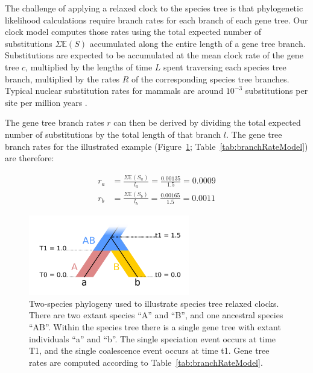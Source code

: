 \documentclass[nogrid]{MBE}%
\begin{document}
The challenge of applying a relaxed clock to the species tree is that
phylogenetic likelihood calculations require branch rates for each branch of
each gene tree. Our clock model computes those rates using the total expected
number of substitutions $\Sigma \mathbb{E}(S)$ accumulated along the entire
length of a gene tree branch. Substitutions are expected to be accumulated at
the mean clock rate of the gene tree $c$, multiplied by the lengths of time
$L$ spent traversing each species tree branch, multiplied by the rates $R$ of
the corresponding species tree branches.
Typical nuclear substitution rates for mammals are around $10^{-3}$ substitutions per
site per million years \citep{Phillips06102009}.

The gene tree branch rates $r$ can then be derived by dividing the total
expected number of substitutions by the total length of that branch $l$. The
gene tree branch rates for the illustrated example
(Figure~\ref{fig:branchRateModel}; Table~\ref{tab:branchRateModel}) are
therefore:

\begin{align}
r_a &= \frac{\Sigma \mathbb{E}(S_a)}{l_a} = \frac{0.00135}{1.5} = 0.0009\\
r_b &= \frac{\Sigma \mathbb{E}(S_b)}{l_b} = \frac{0.00165}{1.5} = 0.0011
\end{align}

\begin{figure}[htb!]
\centering
\includegraphics[width=70mm]{relaxed_clock.pdf}
\caption
{Two-species phylogeny used to illustrate species tree relaxed
clocks. There are two extant species ``A'' and ``B'', and one ancestral species ``AB''.
Within the species tree there is a single gene tree with extant individuals ``a''
and ``b''. The single speciation event occurs at time T1, and the single coalescence
event occurs at time t1. Gene tree rates are computed according to Table~\ref{tab:branchRateModel}.}
\label{fig:branchRateModel}
\end{figure}
\end{document}
